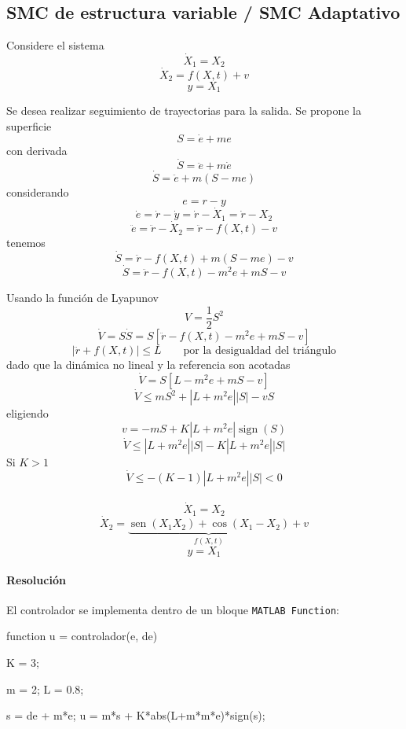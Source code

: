 \clearpage
\begin{flushright}
\end{flushright}

\subsection{SMC de estructura variable / SMC Adaptativo}

Considere el sistema
\[
  \dot{X}_1=X_2
\]
\[
  \dot{X}_2=f(X,t)+v
\]
\[
  y=X_1
\]

Se desea realizar seguimiento de trayectorias para la salida. Se propone la
superficie
\[
  S=\dot{e}+me
\]
con derivada
\[
  \dot{S}=\ddot{e}+m\dot{e}
\]
\[
  \dot{S}=\ddot{e}+m(S-me)
\]
considerando
\[
  e=r-y
\]
\[
  \dot{e}=\dot{r}-\dot{y}=\dot{r}-\dot{X}_1=\dot{r}-X_2
\]
\[
  \ddot{e}=\ddot{r}-\dot{X}_2=\ddot{r}-f(X,t)-v
\]
tenemos
\[
  \dot{S}=\ddot{r}-f(X,t)+m(S-me)-v
\]
\[
  \dot{S}=\ddot{r}-f(X,t)-m^2e+mS-v
\]

Usando la función de Lyapunov
\[
  V=\frac{1}{2}S^2
\]
\[
  \dot{V}=S\dot{S}
  =S\left[\ddot{r}-f(X,t)-m^2e+mS-v\right]
\]
\[
  \left\lvert\ddot{r}+f(X,t)\right\rvert\leq L
  \qquad\text{por la desigualdad del triángulo}
\]
dado que la dinámica no lineal y la referencia son acotadas
\[
  \dot{V}=S\left[L-m^2e+mS-v\right]
\]
\[
  \dot{V}\leq mS^2+\left\lvert L+m^2e\right\rvert\lvert S\rvert-vS
\]
eligiendo
\[
  v=-mS+K\left\lvert L+m^2e\right\rvert\operatorname{sign}(S)
\]
\[
  \dot{V}\leq\left\lvert L+m^2e\right\rvert\lvert S\rvert
  -K\left\lvert L+m^2e\right\rvert\lvert S\rvert
\]
Si $K>1$
\[
  \dot{V}\leq-(K-1)\left\lvert L+m^2e\right\rvert\lvert S\rvert<0
\]

\paragraph{}
\[
  \dot{X}_1=X_2
\]
\[
  \dot{X}_2=
  \underbrace{\operatorname{sen}(X_1X_2)+\cos(X_1-X_2)}_{f(X,t)}+v
\]
\[
  y=X_1
\]

\paragraph{Resolución}

El controlador se implementa dentro de un bloque \texttt{MATLAB Function}:

\begin{MatlabCode}
function u = controlador(e, de)

K = 3;

m = 2;
L = 0.8; %

s = de + m*e;
u = m*s + K*abs(L+m*m*e)*sign(s);
\end{MatlabCode}

